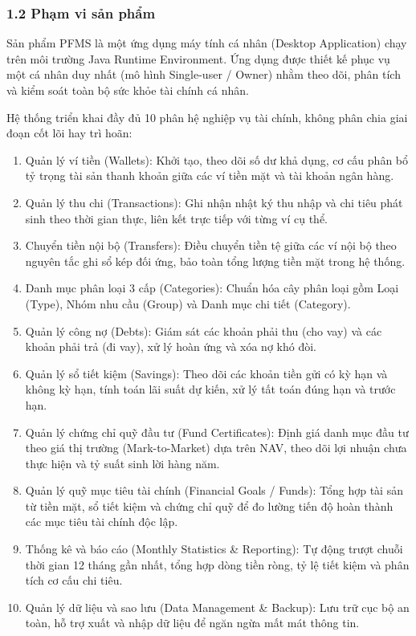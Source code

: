 \documentclass[11pt,a4paper]{article}
\providecommand{\tightlist}{
  \setlength{\itemsep}{0pt}\setlength{\parskip}{0pt}}
\begin{document}
\subsubsection{1.2 Phạm vi sản
phẩm}\label{12-phux1ea1m-vi-sux1ea3n-phux1ea9m}

Sản phẩm PFMS là một ứng dụng máy tính cá nhân (Desktop Application)
chạy trên môi trường Java Runtime Environment. Ứng dụng được thiết kế
phục vụ một cá nhân duy nhất (mô hình Single-user / Owner) nhằm theo
dõi, phân tích và kiểm soát toàn bộ sức khỏe tài chính cá nhân.

Hệ thống triển khai đầy đủ 10 phân hệ nghiệp vụ tài chính, không phân
chia giai đoạn cốt lõi hay trì hoãn:

\begin{enumerate}
\def\labelenumi{\arabic{enumi}.}
\tightlist
\item
  Quản lý ví tiền (Wallets): Khởi tạo, theo dõi số dư khả dụng, cơ cấu
  phân bổ tỷ trọng tài sản thanh khoản giữa các ví tiền mặt và tài khoản
  ngân hàng.
\item
  Quản lý thu chi (Transactions): Ghi nhận nhật ký thu nhập và chi tiêu
  phát sinh theo thời gian thực, liên kết trực tiếp với từng ví cụ thể.
\item
  Chuyển tiền nội bộ (Transfers): Điều chuyển tiền tệ giữa các ví nội bộ
  theo nguyên tắc ghi sổ kép đối ứng, bảo toàn tổng lượng tiền mặt trong
  hệ thống.
\item
  Danh mục phân loại 3 cấp (Categories): Chuẩn hóa cây phân loại gồm
  Loại (Type), Nhóm nhu cầu (Group) và Danh mục chi tiết (Category).
\item
  Quản lý công nợ (Debts): Giám sát các khoản phải thu (cho vay) và các
  khoản phải trả (đi vay), xử lý hoàn ứng và xóa nợ khó đòi.
\item
  Quản lý sổ tiết kiệm (Savings): Theo dõi các khoản tiền gửi có kỳ hạn
  và không kỳ hạn, tính toán lãi suất dự kiến, xử lý tất toán đúng hạn
  và trước hạn.
\item
  Quản lý chứng chỉ quỹ đầu tư (Fund Certificates): Định giá danh mục
  đầu tư theo giá thị trường (Mark-to-Market) dựa trên NAV, theo dõi lợi
  nhuận chưa thực hiện và tỷ suất sinh lời hàng năm.
\item
  Quản lý quỹ mục tiêu tài chính (Financial Goals / Funds): Tổng hợp tài
  sản từ tiền mặt, sổ tiết kiệm và chứng chỉ quỹ để đo lường tiến độ
  hoàn thành các mục tiêu tài chính độc lập.
\item
  Thống kê và báo cáo (Monthly Statistics \& Reporting): Tự động trượt
  chuỗi thời gian 12 tháng gần nhất, tổng hợp dòng tiền ròng, tỷ lệ tiết
  kiệm và phân tích cơ cấu chi tiêu.
\item
  Quản lý dữ liệu và sao lưu (Data Management \& Backup): Lưu trữ cục bộ
  an toàn, hỗ trợ xuất và nhập dữ liệu để ngăn ngừa mất mát thông tin.
\end{enumerate}
\end{document}
